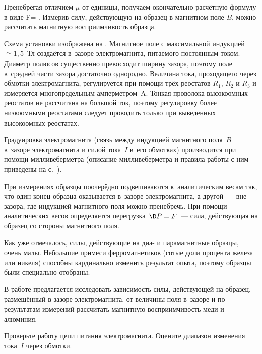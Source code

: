 Пренебрегая отличием $\mu$ от единицы, получаем окончательно расчётную формулу в виде
F=-.
\ee
Измерив силу, действующую на образец в магнитном поле $B$, можно рассчитать магнитную восприимчивость образца.


\eo Схема установки изображена на . Магнитное поле с максимальной индукцией~${\simeq}1,5$~Тл создаётся в~зазоре
электромагнита, питаемого постоянным током. Диаметр полюсов существенно превосходит ширину зазора, поэтому поле
в~средней части зазора достаточно однородно. Величина тока, проходящего через обмотки электромагнита, регулируется при
помощи трёх реостатов $R_1$, $R_2$ и $R_3$ и измеряется многопредельным амперметром~A. Тонкая проволока высокоомных
реостатов не рассчитана на большой ток, поэтому регулировку более низкоомными реостатами следует проводить только при
 выведенных высокоомных реостатах.

Градуировка электромагнита (связь между индукцией магнитного поля~$B$ в~зазоре электромагнита и силой тока~$I$ в~его
обмотках) производится при помощи милливеберметра (описание милливеберметра и правила работы с ним приведены на
с.~\pageref{MWB}).

При измерениях образцы поочерёдно подвешиваются к~аналитическим весам так, что один конец образца оказывается в~зазоре
электромагнита, а другой~--- вне зазора, где индукцией магнитного поля можно пренебречь. При помощи аналитических весов
определяется перегрузка~$\D P=F$~--- сила, действующая на образец со стороны магнитного поля.

Как уже отмечалось, силы, действующие на диа- и парамагнитные образцы, очень малы. Небольшие примеси ферромагнетиков
(сотые доли процента железа или никеля) способны кардинально изменить результат опыта, поэтому образцы были специально
отобраны.

\zad

В работе предлагается исследовать зависимость силы, действующей на образец, размещённый в зазоре электромагнита, от
величины поля в~зазоре и по результатам измерений рассчитать магнитную восприимчивость меди и алюминия.

\dopop


\n Проверьте работу цепи питания электромагнита. Оцените диапазон изменения тока~$I$ через обмотки.

